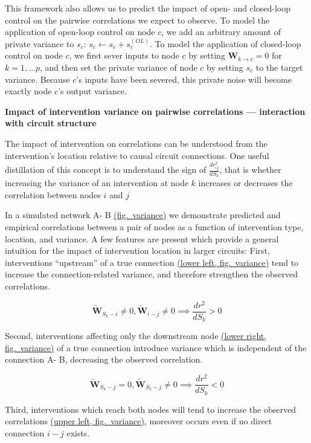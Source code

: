 \documentclass{article}
\begin{document}
This framework also allows us to predict the impact of open- and closed-loop control on the pairwise correlations we expect to observe. To model the application of open-loop control on node \(c\), we add an arbitrary amount of private variance to \(s_c\):
\(s_c \leftarrow s_c + s_c^{(OL)}\). To model the application of closed-loop control on node \(c\), we first sever inputs to node \(c\)
by setting \(\mathbf{W}_{k→c} = 0\) for \(k = 1, \dots p\), and then set the private variance of node \(c\) by setting \(s_c\) to the target variance. Because \(c\)'s inputs have been severed, this private noise will become exactly node \(c\)'s output variance.

\textbf{Impact of intervention variance on pairwise correlations ---
interaction with circuit structure}

The impact of intervention on correlations can be understood from the intervention's location relative to causal circuit connections. One useful distillation of this concept is to understand the sign of
\(\frac{dr^2_{ij}}{dS_k}\), that is whether increasing the variance of an intervention at node \(k\) increases or decreases the correlation between nodes \(i\) and \(j\)

In a simulated network A- B \protect\hyperlink{fig-var}{(fig.~variance)}
we demonstrate predicted and empirical correlations between a pair of nodes as a function of intervention type, location, and variance. A few features are present which provide a general intuition for the impact of intervention location in larger circuits: First, interventions
``upstream'' of a true connection \protect\hyperlink{fig-var}{(lower left, fig.~variance)} tend to increase the connection-related variance, and therefore strengthen the observed correlations.

\[\mathbf{\widetilde{W}}_ {S_k- i} \neq 0, \mathbf{\widetilde{W}}_ {i- j} \neq 0 \implies \frac{dr^2}{dS_k} > 0\]

Second, interventions affecting only the downstream node
\protect\hyperlink{fig-var}{(lower right, fig.~variance)} of a true connection introduce variance which is independent of the connection A- B, decreasing the observed correlation.

\[\mathbf{\widetilde{W}}_ {S_k -  j} = 0 , \mathbf{\widetilde{W}}_ {S_k -  j} \neq 0 \implies \frac{dr^2}{dS_k} < 0\]

Third, interventions which reach both nodes will tend to increase the observed correlations \protect\hyperlink{fig-var}{(upper left, fig.~variance)}, moreover occurs even if no direct connection \(i- j\)
exists.
\end{document}
